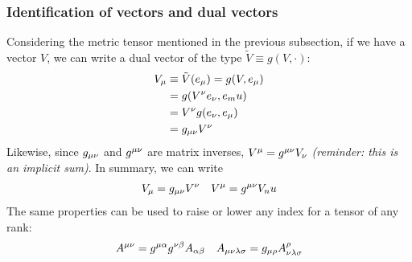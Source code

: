 \subsubsection{Identification of vectors and dual vectors}
Considering the metric tensor mentioned in the previous subsection, if we have a vector $V$, we can write a dual vector of the type $\tilde V\equiv g(V,\cdot)$:
\begin{equation}
\begin{aligned}
V_\mu&\equiv \tilde V(e_\mu)=g(V,e_\mu)\\
&=g(V^\nu e_\nu,e_mu)\\
&=V^\nu g(e_\nu,e_\mu)\\
&=g_{\mu\nu} V^\nu
\end{aligned}
\end{equation}
Likewise, since $g_{\mu\nu}$ and $g^{\mu\nu}$ are matrix inverses, $V^\mu=g^{\mu\nu} V_\nu$ \emph{(reminder: this is an implicit sum)}. In summary, we can write
\begin{align}
V_\mu=g_{\mu\nu} V^\nu && V^\mu=g^{\mu\nu} V_nu
\end{align}
The same properties can be used to raise or lower any index for a tensor of any rank:
\begin{align}
A^{\mu\nu}=g^{\mu\alpha}g^{\nu\beta}A_{\alpha\beta} && A_{\mu\nu\lambda\sigma}=g_{\mu\rho}A^\rho_{\nu\lambda\sigma}
\end{align} 
